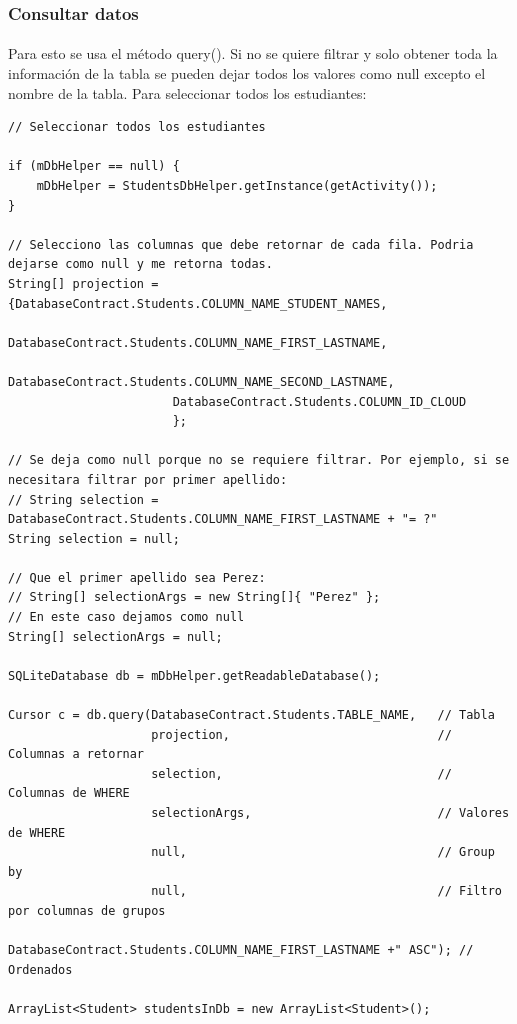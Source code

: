 \documentclass[10pt]{extarticle}
\begin{document}
\subsubsection{Consultar datos}
\paragraph{}
Para esto se usa el método query(). Si no se quiere filtrar y solo obtener toda la información de la tabla se pueden dejar todos los valores como null excepto el nombre de la tabla. Para seleccionar todos los estudiantes:

\begin{lstlisting}
// Seleccionar todos los estudiantes

if (mDbHelper == null) {
    mDbHelper = StudentsDbHelper.getInstance(getActivity());
}

// Selecciono las columnas que debe retornar de cada fila. Podria dejarse como null y me retorna todas.
String[] projection = {DatabaseContract.Students.COLUMN_NAME_STUDENT_NAMES,
                       DatabaseContract.Students.COLUMN_NAME_FIRST_LASTNAME,
                       DatabaseContract.Students.COLUMN_NAME_SECOND_LASTNAME,
                       DatabaseContract.Students.COLUMN_ID_CLOUD
                       };

// Se deja como null porque no se requiere filtrar. Por ejemplo, si se necesitara filtrar por primer apellido:
// String selection = DatabaseContract.Students.COLUMN_NAME_FIRST_LASTNAME + "= ?"
String selection = null;

// Que el primer apellido sea Perez:
// String[] selectionArgs = new String[]{ "Perez" };
// En este caso dejamos como null
String[] selectionArgs = null;

SQLiteDatabase db = mDbHelper.getReadableDatabase();

Cursor c = db.query(DatabaseContract.Students.TABLE_NAME,   // Tabla
                    projection,                             // Columnas a retornar
                    selection,                              // Columnas de WHERE
                    selectionArgs,                          // Valores de WHERE
                    null,                                   // Group by
                    null,                                   // Filtro por columnas de grupos
                    DatabaseContract.Students.COLUMN_NAME_FIRST_LASTNAME +" ASC"); // Ordenados

ArrayList<Student> studentsInDb = new ArrayList<Student>();


\end{lstlisting}
\end{document}
